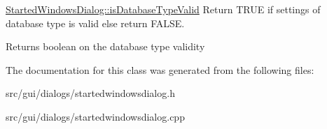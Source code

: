 \hyperlink{classGui_1_1Dialogs_1_1StartedWindowsDialog_ad582a62ec4204c2ef5081c5431824491}{Started\+Windows\+Dialog\+::is\+Database\+Type\+Valid} Return T\+R\+U\+E if settings of database type is valid else return F\+A\+L\+S\+E. 

\begin{DoxyReturn}{Returns}
boolean on the database type validity 
\end{DoxyReturn}


The documentation for this class was generated from the following files\+:\begin{DoxyCompactItemize}
\item 
src/gui/dialogs/startedwindowsdialog.\+h\item 
src/gui/dialogs/startedwindowsdialog.\+cpp\end{DoxyCompactItemize}
